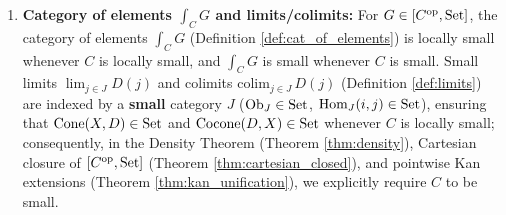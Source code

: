 \documentclass[10pt,a4paper]{article}
\begin{document}
\begin{enumerate}
\item \textbf{Category of elements $\int_C G$ and limits/colimits:} For $G \in [C^{\textrm{op}}, {\textrm{Set}}]$, the category of elements $\int_C G$ (Definition \ref{def:cat_of_elements}) is locally small whenever $C$ is locally small, and $\int_C G$ is small whenever $C$ is small. Small limits $\lim_{j \in J} D(j)$ and colimits $\mathrm{colim}_{j \in J}\, D(j)$ (Definition \ref{def:limits}) are indexed by a \textbf{small} category $J$ (${\textrm{Ob}}_J \in {\textrm{Set}}$, ${\textrm{Hom}}_J(i, j) \in {\textrm{Set}}$), ensuring that ${\mathrm{Cone}}(X, D) \in {\textrm{Set}}$ and ${\mathrm{Cocone}}(D, X) \in {\textrm{Set}}$ whenever $C$ is locally small; consequently, in the Density Theorem (Theorem \ref{thm:density}), Cartesian closure of $[C^{\textrm{op}}, {\textrm{Set}}]$ (Theorem \ref{thm:cartesian_closed}), and pointwise Kan extensions (Theorem \ref{thm:kan_unification}), we explicitly require $C$ to be small.
\end{enumerate}
\end{document}
